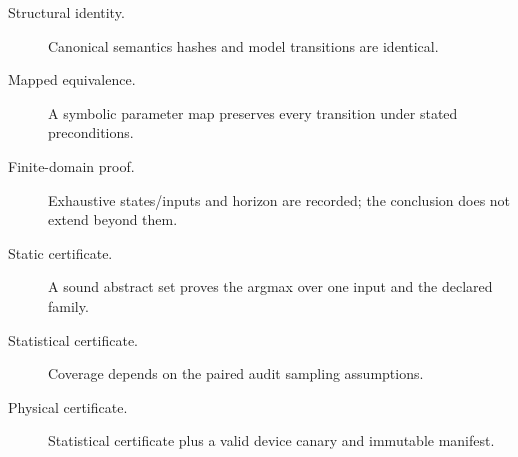 \begin{description}
\item[Structural identity.] Canonical semantics hashes and model transitions are
identical.
\item[Mapped equivalence.] A symbolic parameter map preserves every transition
under stated preconditions.
\item[Finite-domain proof.] Exhaustive states/inputs and horizon are recorded;
the conclusion does not extend beyond them.
\item[Static certificate.] A sound abstract set proves the argmax over one input
and the declared family.
\item[Statistical certificate.] Coverage depends on the paired audit sampling
assumptions.
\item[Physical certificate.] Statistical certificate plus a valid device canary
and immutable manifest.
\end{description}
